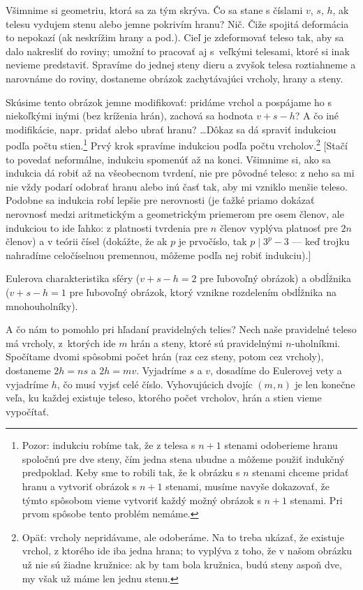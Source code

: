\documentclass[a4paper]{article}
\begin{document}
Všimnime si geometriu, ktorá sa za tým skrýva. Čo sa stane s číslami $v$, $s$, $h$, ak telesu vydujem stenu alebo jemne pokrivím hranu? Nič. Čiže spojitá deformácia to nepokazí (ak neskrížim hrany a pod.). Cieľ je zdeformovať teleso tak, aby sa dalo nakresliť do roviny; umožní to pracovať aj s~veľkými telesami, ktoré si inak nevieme predstaviť. Spravíme do jednej steny dieru a zvyšok telesa roztiahneme a narovnáme do roviny, dostaneme obrázok zachytávajúci vrcholy, hrany a steny.

Skúsime tento obrázok jemne modifikovať: pridáme vrchol a pospájame ho s niekoľkými inými (bez kríženia hrán), zachová sa hodnota $v+s-h$? A čo iné modifikácie, napr. pridať alebo ubrať hranu? \dots Dôkaz sa dá spraviť indukciou podľa počtu stien.\footnote{Pozor: indukciu robíme tak, že z telesa s $n+1$ stenami odoberieme hranu spoločnú pre dve steny, čím jedna stena ubudne a môžeme použiť indukčný predpoklad. Keby sme to robili tak, že k obrázku s $n$ stenami chceme pridať hranu a vytvoriť obrázok s $n+1$ stenami, musíme navyše dokazovať, že týmto spôsobom vieme vytvoriť každý možný obrázok s $n+1$ stenami. Pri prvom spôsobe tento problém nemáme.} Prvý krok spravíme indukciou podľa počtu vrcholov.\footnote{Opäť: vrcholy nepridávame, ale odoberáme. Na to treba ukázať, že existuje vrchol, z ktorého ide iba jedna hrana; to vyplýva z toho, že v našom obrázku už nie sú žiadne kružnice: ak by tam bola kružnica, budú steny aspoň dve, my však už máme len jednu stenu.} [Stačí to povedať neformálne, indukciu spomenúť až na konci. Všimnime si, ako sa indukcia dá robiť až na všeobecnom tvrdení, nie pre pôvodné teleso: z neho sa mi nie vždy podarí odobrať hranu alebo inú časť tak, aby mi vzniklo menšie teleso. Podobne sa indukcia robí lepšie pre nerovnosti (je ťažké priamo dokázať nerovnosť medzi aritmetickým a geometrickým priemerom pre osem členov, ale indukciou to ide ľahko: z platnosti tvrdenia pre $n$ členov vyplýva platnosť pre $2n$ členov) a v teórii čísel (dokážte, že ak $p$ je prvočíslo, tak $p\mid 3^p-3$ --- keď trojku nahradíme celočíselnou premennou, môžeme podľa nej robiť indukciu).]

Eulerova charakteristika sféry ($v+s-h = 2$ pre ľubovoľný obrázok) a obdĺžnika ($v+s-h=1$ pre ľubovoľný obrázok, ktorý vznikne rozdelením obdĺžnika na mnohouholníky).

A čo nám to pomohlo pri hľadaní pravidelných telies? Nech naše pravidelné teleso má vrcholy, z~ktorých ide $m$ hrán a steny, ktoré sú pravidelnými $n$-uholníkmi.
Spočítame dvomi spôsobmi počet hrán (raz cez steny, potom cez vrcholy), dostaneme $2h = ns$ a $2h = mv$. Vyjadríme $s$ a $v$, dosadíme do Eulerovej vety a vyjadríme $h$, čo musí vyjsť celé číslo. Vyhovujúcich dvojíc $(m,n)$ je len konečne veľa, ku každej existuje teleso, ktorého počet vrcholov, hrán a stien vieme vypočítať.
\end{document}
